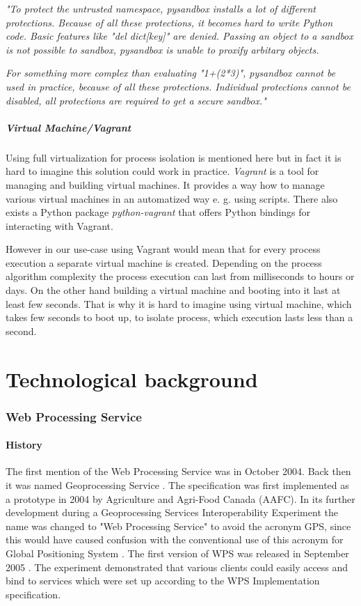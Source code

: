 \documentclass[12pt,a4paper]{article}
\begin{document}
\textit{
"To protect the untrusted namespace, pysandbox installs a lot of
different protections. Because of all these protections, it becomes
hard to write Python code. Basic features like "del dict[key]" are
denied. Passing an object to a sandbox is not possible to sandbox,
pysandbox is unable to proxify arbitary objects.}

\textit{
For something more complex than evaluating "1+(2*3)", pysandbox cannot
be used in practice, because of all these protections. Individual
protections cannot be disabled, all protections are required to get a
secure sandbox."}

\subsubsection{Virtual Machine/Vagrant}
Using full virtualization for process isolation is mentioned here but in fact it is hard to imagine this solution could work
in practice. \textit{Vagrant} is a tool for managing and building virtual machines. It provides a way how to manage various virtual 
machines in an automatized way e. g. using scripts. There also exists a Python package \textit{python-vagrant} that offers 
Python bindings for interacting with Vagrant.

However in our use-case using Vagrant would mean that for every process execution a separate virtual machine is created. Depending
on the process algorithm complexity the process execution can last from milliseconds to hours or days. On the other hand building 
a virtual machine and booting into it last at least few seconds. That is why it is hard to imagine using virtual machine, which takes
few seconds to boot up, to isolate process, which execution lasts less than a second.

\newpage
\part{Technological background}

\newpage
\section{Web Processing Service}

\subsection{History}
The first mention of the Web Processing Service was in October 2004. Back then it
was named Geoprocessing Service \cite{OGC_news}. The specification was first 
implemented as a prototype in 2004 by Agriculture and Agri-Food Canada (AAFC).
In its further development during a Geoprocessing Services Interoperability Experiment \cite{WPS_experiment} 
the name was changed to "Web Processing Service" to avoid the acronym GPS, since 
this would have caused confusion with the conventional use of this acronym for 
Global Positioning System \cite{WPS_standart_1.0}. The first version of WPS was released in
September 2005 \cite{WPS_first}. The experiment demonstrated that various clients
could easily access and bind to services which were set up according to the WPS Implementation
specification.
\end{document}
